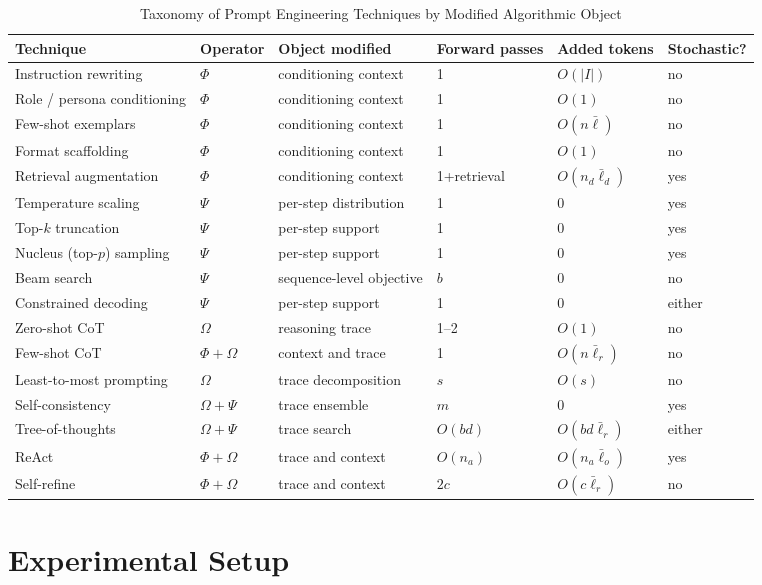 \documentclass[conference]{IEEEtran}
\begin{document}
\begin{table}[htbp]
\caption{Taxonomy of Prompt Engineering Techniques by Modified Algorithmic Object}
\centering
\small
\begin{tabular}{llllll}
\toprule
\textbf{Technique} & \textbf{Operator} & \textbf{Object modified} & \textbf{Forward passes} & \textbf{Added tokens} & \textbf{Stochastic?} \\
\midrule
Instruction rewriting & $\Phi$ & conditioning context & 1 & $O(|I|)$ & no \\
Role / persona conditioning & $\Phi$ & conditioning context & 1 & $O(1)$ & no \\
Few-shot exemplars & $\Phi$ & conditioning context & 1 & $O(n\bar{\ell})$ & no \\
Format scaffolding & $\Phi$ & conditioning context & 1 & $O(1)$ & no \\
Retrieval augmentation & $\Phi$ & conditioning context & 1+retrieval & $O(n_d\bar{\ell}_d)$ & yes \\
\midrule
Temperature scaling & $\Psi$ & per-step distribution & 1 & 0 & yes \\
Top-$k$ truncation & $\Psi$ & per-step support & 1 & 0 & yes \\
Nucleus (top-$p$) sampling & $\Psi$ & per-step support & 1 & 0 & yes \\
Beam search & $\Psi$ & sequence-level objective & $b$ & 0 & no \\
Constrained decoding & $\Psi$ & per-step support & 1 & 0 & either \\
\midrule
Zero-shot CoT & $\Omega$ & reasoning trace & 1--2 & $O(1)$ & no \\
Few-shot CoT & $\Phi + \Omega$ & context and trace & 1 & $O(n\bar{\ell}_r)$ & no \\
Least-to-most prompting & $\Omega$ & trace decomposition & $s$ & $O(s)$ & no \\
Self-consistency & $\Omega + \Psi$ & trace ensemble & $m$ & 0 & yes \\
Tree-of-thoughts & $\Omega + \Psi$ & trace search & $O(bd)$ & $O(bd\bar{\ell}_r)$ & either \\
ReAct & $\Phi + \Omega$ & trace and context & $O(n_a)$ & $O(n_a\bar{\ell}_o)$ & yes \\
Self-refine & $\Phi + \Omega$ & trace and context & $2c$ & $O(c\bar{\ell}_r)$ & no \\
\bottomrule
\end{tabular}
\label{tab:taxonomy}
\end{table}\section{Experimental Setup}
\label{sec:setup}
\end{document}
